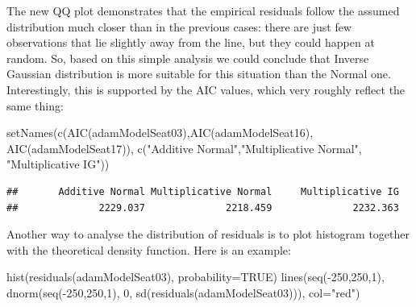 \documentclass[
]{book}
\newenvironment{Shaded}{\begin{snugshade}}{\end{snugshade}}
\newcommand{\AttributeTok}[1]{\textcolor[rgb]{0.77,0.63,0.00}{#1}}
\newcommand{\ConstantTok}[1]{\textcolor[rgb]{0.00,0.00,0.00}{#1}}
\newcommand{\DecValTok}[1]{\textcolor[rgb]{0.00,0.00,0.81}{#1}}
\newcommand{\FunctionTok}[1]{\textcolor[rgb]{0.00,0.00,0.00}{#1}}
\newcommand{\NormalTok}[1]{#1}
\newcommand{\SpecialCharTok}[1]{\textcolor[rgb]{0.00,0.00,0.00}{#1}}
\newcommand{\StringTok}[1]{\textcolor[rgb]{0.31,0.60,0.02}{#1}}
\theoremstyle{definition}
\theoremstyle{definition}
\theoremstyle{definition}
\theoremstyle{definition}
\theoremstyle{remark}
\begin{document}
The new QQ plot demonstrates that the empirical residuals follow the assumed distribution much closer than in the previous cases: there are just few observations that lie slightly away from the line, but they could happen at random. So, based on this simple analysis we could conclude that Inverse Gaussian distribution is more suitable for this situation than the Normal one. Interestingly, this is supported by the AIC values, which very roughly reflect the same thing:

\begin{Shaded}
\begin{Highlighting}[]
\FunctionTok{setNames}\NormalTok{(}\FunctionTok{c}\NormalTok{(}\FunctionTok{AIC}\NormalTok{(adamModelSeat03),}\FunctionTok{AIC}\NormalTok{(adamModelSeat16),}
           \FunctionTok{AIC}\NormalTok{(adamModelSeat17)),}
         \FunctionTok{c}\NormalTok{(}\StringTok{"Additive Normal"}\NormalTok{,}\StringTok{"Multiplicative Normal"}\NormalTok{,}
           \StringTok{"Multiplicative IG"}\NormalTok{))}
\end{Highlighting}
\end{Shaded}

\begin{verbatim}
##       Additive Normal Multiplicative Normal     Multiplicative IG 
##              2229.037              2218.459              2232.363
\end{verbatim}

Another way to analyse the distribution of residuals is to plot histogram together with the theoretical density function. Here is an example:

\begin{Shaded}
\begin{Highlighting}[]
\FunctionTok{hist}\NormalTok{(}\FunctionTok{residuals}\NormalTok{(adamModelSeat03), }\AttributeTok{probability=}\ConstantTok{TRUE}\NormalTok{)}
\FunctionTok{lines}\NormalTok{(}\FunctionTok{seq}\NormalTok{(}\SpecialCharTok{{-}}\DecValTok{250}\NormalTok{,}\DecValTok{250}\NormalTok{,}\DecValTok{1}\NormalTok{),}
      \FunctionTok{dnorm}\NormalTok{(}\FunctionTok{seq}\NormalTok{(}\SpecialCharTok{{-}}\DecValTok{250}\NormalTok{,}\DecValTok{250}\NormalTok{,}\DecValTok{1}\NormalTok{), }\DecValTok{0}\NormalTok{, }\FunctionTok{sd}\NormalTok{(}\FunctionTok{residuals}\NormalTok{(adamModelSeat03))),}
      \AttributeTok{col=}\StringTok{"red"}\NormalTok{)}
\end{Highlighting}
\end{Shaded}
\end{document}
